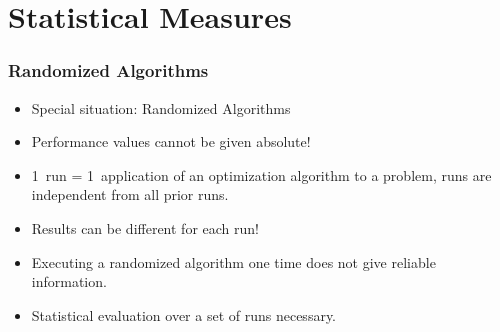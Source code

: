 \documentclass[mathserif]{beamer}%
\begin{document}
\section{Statistical Measures}%
%
\begin{frame}\frametitle{Randomized Algorithms}%
%
\begin{itemize}%
\item Special situation: Randomized Algorithms%
\item<2-> Performance values cannot be given absolute!%
\item<3-> 1~run = 1~application of an optimization algorithm to a problem, runs are independent from all prior runs.%
\item<4-> Results can be different for each run!%
\item<5-> Executing a randomized algorithm one time does not give reliable information.%
\item<6-> Statistical evaluation over a set of runs necessary.%
\end{itemize}%
\end{frame}%
%
%
\end{document}
